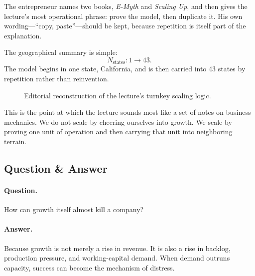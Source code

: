 The entrepreneur names two books, \emph{E-Myth} and \emph{Scaling Up}, and then gives the lecture's most operational phrase: prove the model, then duplicate it. His own wording---``copy, paste''---should be kept, because repetition is itself part of the explanation.

The geographical summary is simple:
\begin{equation}
N_{\mathrm{states}} : 1 \rightarrow 43.
\end{equation}
The model begins in one state, California, and is then carried into $43$ states by repetition rather than reinvention.

\begin{figure}[h]
\centering
{}
\caption{Editorial reconstruction of the lecture's turnkey scaling logic.}
\end{figure}

This is the point at which the lecture sounds most like a set of notes on business mechanics. We do not scale by cheering ourselves into growth. We scale by proving one unit of operation and then carrying that unit into neighboring terrain.

\subsection{Question \& Answer}

\paragraph{Question.} How can growth itself almost kill a company?

\paragraph{Answer.} Because growth is not merely a rise in revenue. It is also a rise in backlog, production pressure, and working-capital demand. When demand outruns capacity, success can become the mechanism of distress.

